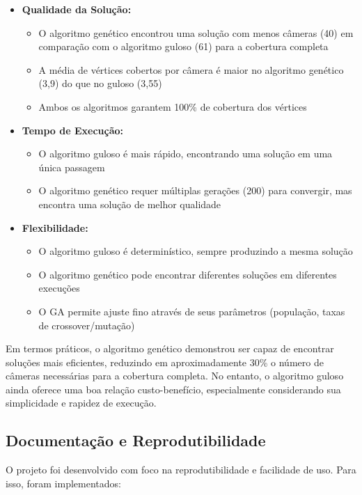 \documentclass[12pt, a4paper]{report}
\begin{document}
\begin{itemize}
    \item \textbf{Qualidade da Solução:}
    \begin{itemize}
        \item O algoritmo genético encontrou uma solução com menos câmeras (40) em comparação com o algoritmo guloso (61) para a cobertura completa
        \item A média de vértices cobertos por câmera é maior no algoritmo genético (3,9) do que no guloso (3,55)
        \item Ambos os algoritmos garantem 100\% de cobertura dos vértices
    \end{itemize}
    
    \item \textbf{Tempo de Execução:}
    \begin{itemize}
        \item O algoritmo guloso é mais rápido, encontrando uma solução em uma única passagem
        \item O algoritmo genético requer múltiplas gerações (200) para convergir, mas encontra uma solução de melhor qualidade
    \end{itemize}
    
    \item \textbf{Flexibilidade:}
    \begin{itemize}
        \item O algoritmo guloso é determinístico, sempre produzindo a mesma solução
        \item O algoritmo genético pode encontrar diferentes soluções em diferentes execuções
        \item O GA permite ajuste fino através de seus parâmetros (população, taxas de crossover/mutação)
    \end{itemize}
\end{itemize}

Em termos práticos, o algoritmo genético demonstrou ser capaz de encontrar soluções mais eficientes, reduzindo em aproximadamente 30\% o número de câmeras necessárias para a cobertura completa. No entanto, o algoritmo guloso ainda oferece uma boa relação custo-benefício, especialmente considerando sua simplicidade e rapidez de execução.

\subsection{Documentação e Reprodutibilidade}
O projeto foi desenvolvido com foco na reprodutibilidade e facilidade de uso. Para isso, foram implementados:
\end{document}
